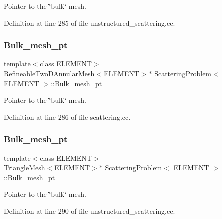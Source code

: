 Pointer to the \char`\"{}bulk\char`\"{} mesh. 



Definition at line 285 of file unstructured\+\_\+scattering.\+cc.

\mbox{\label{classScatteringProblem_a8c61657a1d09ce49a5871ca3febe5658}} 
\subsubsection{\texorpdfstring{Bulk\+\_\+mesh\+\_\+pt}{Bulk\_mesh\_pt}\hspace{0.1cm}{\footnotesize\ttfamily [2/4]}}
{\footnotesize\ttfamily template$<$class E\+L\+E\+M\+E\+NT$>$ \\
Refineable\+Two\+D\+Annular\+Mesh$<$E\+L\+E\+M\+E\+NT$>$$\ast$ \hyperlink{classScatteringProblem}{Scattering\+Problem}$<$ E\+L\+E\+M\+E\+NT $>$\+::Bulk\+\_\+mesh\+\_\+pt}



Pointer to the \char`\"{}bulk\char`\"{} mesh. 



Definition at line 286 of file scattering.\+cc.

\mbox{\label{classScatteringProblem_a75f2722194e3906ef170f016f2ce6d74}} 
\subsubsection{\texorpdfstring{Bulk\+\_\+mesh\+\_\+pt}{Bulk\_mesh\_pt}\hspace{0.1cm}{\footnotesize\ttfamily [3/4]}}
{\footnotesize\ttfamily template$<$class E\+L\+E\+M\+E\+NT$>$ \\
Triangle\+Mesh$<$E\+L\+E\+M\+E\+NT$>$$\ast$ \hyperlink{classScatteringProblem}{Scattering\+Problem}$<$ E\+L\+E\+M\+E\+NT $>$\+::Bulk\+\_\+mesh\+\_\+pt}



Pointer to the \char`\"{}bulk\char`\"{} mesh. 



Definition at line 290 of file unstructured\+\_\+scattering.\+cc.

